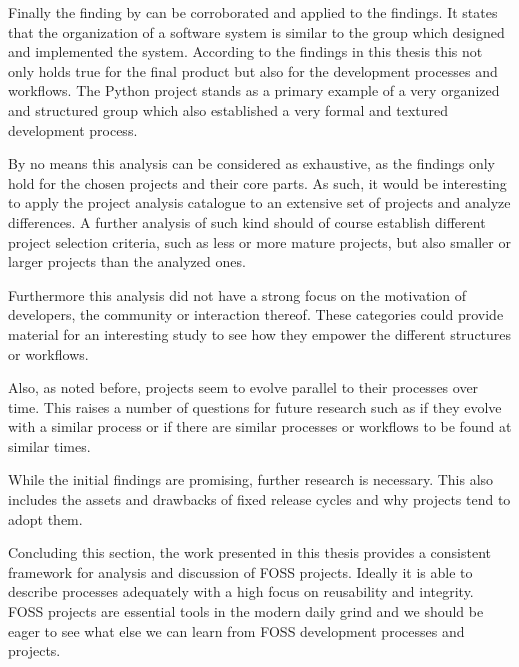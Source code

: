 Finally the finding by \textcite{Conway1968} can be corroborated and applied to
the findings. It states that the organization of a software system is similar
to the group which designed and implemented the system. According to the
findings in this thesis this not only holds true for the final product but also
for the development processes and workflows. The Python project stands as a
primary example of a very organized and structured group which also established
a very formal and textured development process.

By no means this analysis can be considered as exhaustive, as the findings only
hold for the chosen projects and their core parts. As such, it would be
interesting to apply the project analysis catalogue to an extensive set of
projects and analyze differences. A further analysis of such kind should of
course establish different project selection criteria, such as less or more
mature projects, but also smaller or larger projects than the analyzed ones.

Furthermore this analysis did not have a strong focus on the motivation of
developers, the community or interaction thereof. These categories could
provide material for an interesting study to see how they empower the different
structures or workflows.

Also, as noted before, projects seem to evolve parallel to their processes over
time. This raises a number of questions for future research such as if they
evolve with a similar process or if there are similar processes or workflows to
be found at similar times.

While the initial findings are promising, further research is necessary. This
also includes the assets and drawbacks of fixed release cycles and why projects
tend to adopt them.

Concluding this section, the work presented in this thesis provides a
consistent framework for analysis and discussion of \ac{FOSS} projects. Ideally
it is able to describe processes adequately with a high focus on reusability
and integrity. \acl{FOSS} projects are essential tools in the modern
daily grind and we should be eager to see what else we can learn from
\acl{FOSS} development processes and projects.

